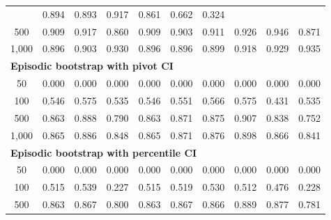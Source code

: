\documentclass{article}
\numberwithin{equation}{section}
\begin{document}
\begin{table}[ht]
\begin{tabular}{c|ccc|cccccc}
& \cellcolor{covheat!97!white}0.894 & \cellcolor{covheat!96!white}0.893 & \cellcolor{covheat!100!white}0.917 & \cellcolor{covheat!80!white}0.861 & 0.662 & 0.324 \\
500
& \cellcolor{covheat!100!white}0.909 & \cellcolor{covheat!100!white}0.917 & \cellcolor{covheat!80!white}0.860
& \cellcolor{covheat!100!white}0.909 & \cellcolor{covheat!100!white}0.903 & \cellcolor{covheat!100!white}0.911 & \cellcolor{covheat!100!white}0.926 & \cellcolor{covheat!100!white}0.946 & \cellcolor{covheat!85!white}0.871 \\
1{,}000
& \cellcolor{covheat!98!white}0.896 & \cellcolor{covheat!100!white}0.903 & \cellcolor{covheat!100!white}0.930
& \cellcolor{covheat!98!white}0.896 & \cellcolor{covheat!98!white}0.896 & \cellcolor{covheat!100!white}0.899 & \cellcolor{covheat!100!white}0.918 & \cellcolor{covheat!100!white}0.929 & \cellcolor{covheat!100!white}0.935 \\
\hline
\multicolumn{10}{l}{\textbf{Episodic bootstrap with pivot CI}} \\ \hline
50
& 0.000 & 0.000 & 0.000
& 0.000 & 0.000 & 0.000 & 0.000 & 0.000 & 0.000 \\
100
& 0.546 & 0.575 & 0.535
& 0.546 & 0.551 & 0.566 & 0.575 & 0.431 & 0.535 \\
500
& \cellcolor{covheat!82!white}0.863 & \cellcolor{covheat!94!white}0.888 & \cellcolor{covheat!45!white}0.790
& \cellcolor{covheat!82!white}0.863 & \cellcolor{covheat!85!white}0.871 & \cellcolor{covheat!87!white}0.875 & \cellcolor{covheat!100!white}0.907 & \cellcolor{covheat!69!white}0.838 & \cellcolor{covheat!26!white}0.752 \\
1{,}000
& \cellcolor{covheat!82!white}0.865 & \cellcolor{covheat!93!white}0.886 & \cellcolor{covheat!74!white}0.848
& \cellcolor{covheat!82!white}0.865 & \cellcolor{covheat!85!white}0.871 & \cellcolor{covheat!88!white}0.876 & \cellcolor{covheat!99!white}0.898 & \cellcolor{covheat!83!white}0.866 & \cellcolor{covheat!70!white}0.841 \\
\hline
\multicolumn{10}{l}{\textbf{Episodic bootstrap with percentile CI}} \\ \hline
50
& 0.000 & 0.000 & 0.000
& 0.000 & 0.000 & 0.000 & 0.000 & 0.000 & 0.000 \\
100
& 0.515 & 0.539 & 0.227
& 0.515 & 0.519 & 0.530 & 0.512 & 0.476 & 0.228 \\
500
& \cellcolor{covheat!82!white}0.863 & \cellcolor{covheat!83!white}0.867 & \cellcolor{covheat!50!white}0.800
& \cellcolor{covheat!82!white}0.863 & \cellcolor{covheat!83!white}0.867 & \cellcolor{covheat!83!white}0.866 & \cellcolor{covheat!94!white}0.889 & \cellcolor{covheat!88!white}0.877 & \cellcolor{covheat!41!white}0.781 \\

\end{tabular}
\end{table}
\end{document}
